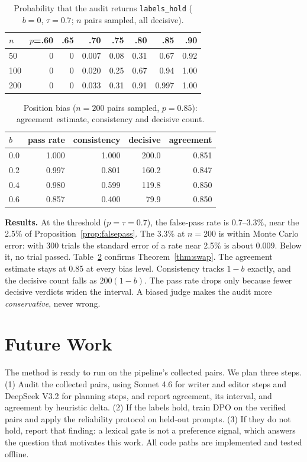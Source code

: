 \documentclass[conference]{IEEEtran}
\theoremstyle{remark}
\begin{document}
\begin{table}[t]
\centering
\caption{Probability that the audit returns \texttt{labels\_hold} ($b=0$, $\tau=0.7$; $n$ pairs sampled, all decisive).}
\label{tab:power}
\begin{tabular}{lrrrrrrr}
\toprule
$n$ & $p$=.60 & .65 & .70 & .75 & .80 & .85 & .90\\
\midrule
50 & 0 & 0 & 0.007 & 0.08 & 0.31 & 0.67 & 0.92\\
100 & 0 & 0 & 0.020 & 0.25 & 0.67 & 0.94 & 1.00\\
200 & 0 & 0 & 0.033 & 0.31 & 0.91 & 0.997 & 1.00\\
\bottomrule
\end{tabular}
\end{table}

\begin{table}[t]
\centering
\caption{Position bias ($n=200$ pairs sampled, $p=0.85$): agreement estimate, consistency and decisive count.}
\label{tab:bias}
\begin{tabular}{lrrrr}
\toprule
$b$ & pass rate & consistency & decisive & agreement\\
\midrule
0.0 & 1.000 & 1.000 & 200.0 & 0.851\\
0.2 & 0.997 & 0.801 & 160.2 & 0.847\\
0.4 & 0.980 & 0.599 & 119.8 & 0.850\\
0.6 & 0.857 & 0.400 & 79.9 & 0.850\\
\bottomrule
\end{tabular}
\end{table}

\textbf{Results.} At the threshold ($p=\tau=0.7$), the false-pass rate is 0.7--3.3\%, near the 2.5\% of Proposition~\ref{prop:falsepass}. The 3.3\% at $n=200$ is within Monte Carlo error: with 300 trials the standard error of a rate near 2.5\% is about 0.009. Below it, no trial passed. Table~\ref{tab:bias} confirms Theorem~\ref{thm:swap}. The agreement estimate stays at 0.85 at every bias level. Consistency tracks $1-b$ exactly, and the decisive count falls as $200(1-b)$. The pass rate drops only because fewer decisive verdicts widen the interval. A biased judge makes the audit more \emph{conservative}, never wrong.

\section{Future Work}
The method is ready to run on the pipeline's collected pairs. We plan three steps. (1) Audit the collected pairs, using Sonnet 4.6 for writer and editor steps and DeepSeek V3.2 for planning steps, and report agreement, its interval, and agreement by heuristic delta. (2) If the labels hold, train DPO on the verified pairs and apply the reliability protocol on held-out prompts. (3) If they do not hold, report that finding: a lexical gate is not a preference signal, which answers the question that motivates this work. All code paths are implemented and tested offline.
\end{document}

